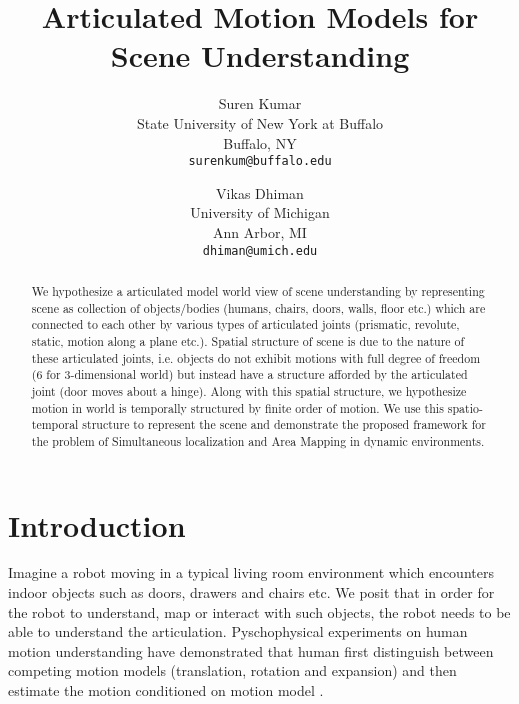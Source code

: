 \documentclass[10pt,twocolumn,letterpaper]{article}
\begin{document}
\title{Articulated Motion Models for Scene Understanding}

\author{Suren Kumar\\
State University of New York at Buffalo \\
Buffalo, NY \\
{\tt\small surenkum@buffalo.edu}
\and
Vikas Dhiman\\
University of Michigan\\
Ann Arbor, MI\\
{\tt\small dhiman@umich.edu}
}

\maketitle

\begin{abstract}
We hypothesize a articulated model world view of scene understanding by representing scene as collection of objects/bodies (humans, chairs, doors, walls, floor etc.) which are connected to each other by various types of articulated joints (prismatic, revolute, static, motion along a plane etc.). Spatial structure of scene is due to the nature of these articulated joints, i.e. objects do not exhibit motions with full degree of freedom (6 for 3-dimensional world) but instead have a structure afforded by the articulated joint (door moves about a hinge). Along with this spatial structure, we hypothesize motion in world is temporally structured by finite order of motion. We use this spatio-temporal structure to represent the scene and demonstrate the proposed framework for the problem of Simultaneous localization and Area Mapping in dynamic environments.
\end{abstract}

\section{Introduction}

Imagine a robot moving in a typical living room environment which encounters indoor objects such as doors, drawers and chairs etc. We posit that in order for the robot to understand, map or interact with such objects, the robot needs to be able to understand the articulation. Pyschophysical experiments on human motion understanding have demonstrated that human first distinguish between competing motion models (translation, rotation and expansion) and then estimate the motion conditioned on motion model \cite{NIPS2008_3458}. 
\end{document}
